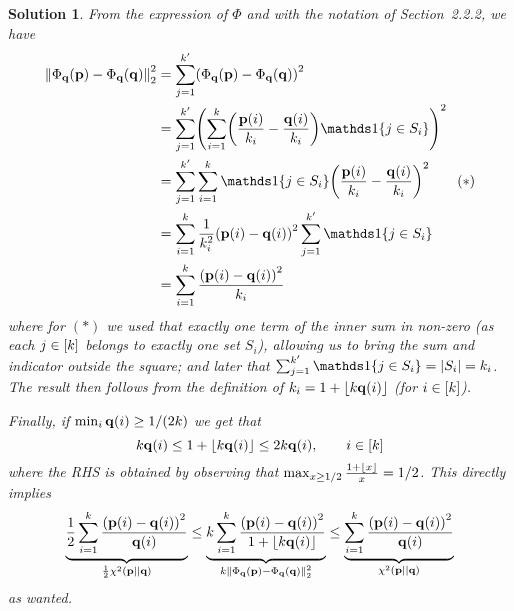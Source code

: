 \documentclass[biber]{nowfnt} %
\newtheorem{solution}{Solution}[chapter]
\begin{document}
\begin{solution}
From the expression of $\Phi$ and with the notation of Section~2.2.2, we have
\begin{align*}
	\normtwo{\Phi_\q(\p)-\Phi_\q(\q)}^2
	&= \sum_{j=1}^{\ab'} \Paren{\Phi_\q(\p)-\Phi_\q(\q)}^2 \\
	&= \sum_{j=1}^{\ab'} \Paren{\sum_{i=1}^\ab \Paren{\frac{\p(i)}{\ab_i} - \frac{\q(i)}{\ab_i}} \indic{j\in S_i} }^2\\
	&= \sum_{j=1}^{\ab'} \sum_{i=1}^\ab \indic{j\in S_i}  \Paren{\frac{\p(i)}{\ab_i} - \frac{\q(i)}{\ab_i}}^2 \tag{$\ast$}\\
	&= \sum_{i=1}^\ab \frac{1}{\ab_i^2} \Paren{\p(i)-\q(i)}^2 \sum_{j=1}^{\ab'}\indic{j\in S_i}  \\
	&= \sum_{i=1}^\ab \frac{\Paren{\p(i)-\q(i)}^2}{\ab_i}  \\
\end{align*}
where for $(\ast)$ we used that exactly one term of the inner sum in non-zero (as each $j\in[k]$ belongs to exactly one  set $S_i$), allowing us to bring the sum and indicator outside the square; and later that $\sum_{j=1}^{\ab'}\indic{j\in S_i} = \abs{S_i} = \ab_i$. The result then follows from the definition of $\ab_i=1+\flr{\ab\q(i)}$ (for $i\in[k]$).

\noindent Finally, if $\min_i \mathbf{q}(i) \geq 1/(2k)$ we get that
\[
	\ab\q(i) \leq 1+\flr{\ab\q(i)} \leq 2\ab\q(i), \qquad i\in[\ab]
\]
where the RHS is obtained by observing that $\max_{x\geq 1/2} \frac{1+\flr{x}}{x} = 1/2$. This directly implies
\[
		\underbrace{\frac{1}{2}\sum_{i=1}^\ab \frac{\Paren{\p(i)-\q(i)}^2}{\q(i)}}_{\frac{1}{2}\chisquare{\p}{\q}} \leq \underbrace{\ab \sum_{i=1}^\ab \frac{\Paren{\p(i)-\q(i)}^2}{1+\flr{\ab\q(i)}}}_{\ab\normtwo{\Phi_\q(\p)-\Phi_\q(\q)}^2} 
		\leq \underbrace{\sum_{i=1}^\ab \frac{\Paren{\p(i)-\q(i)}^2}{\q(i)}}_{\chisquare{\p}{\q}}
\]
as wanted.
\end{solution}
\end{document}
